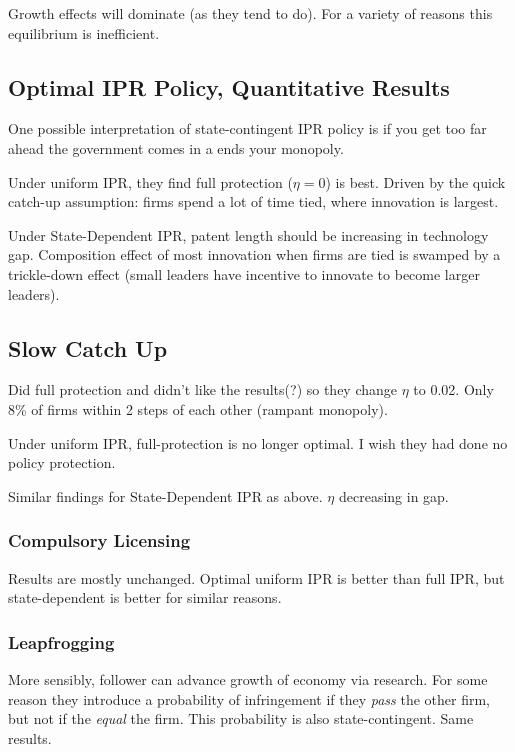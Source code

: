\documentclass[11pt]{article}
\begin{document}
    Growth effects will dominate (as they tend to do).  For a variety of reasons this equilibrium is inefficient.

\subsection{Optimal IPR Policy, Quantitative Results}
\label{sub:optimal_ipr_policy_quantitative_results}

  One possible interpretation of state-contingent IPR policy is if you get too far ahead the government comes in a ends your monopoly.

  Under uniform IPR, they find full protection ($\eta = 0$) is best.  Driven by the quick catch-up assumption: firms spend a lot of time tied, where innovation is largest.

  Under State-Dependent IPR, patent length should be increasing in technology gap.  Composition effect of most innovation when firms are tied is swamped by a trickle-down effect (small leaders have incentive to innovate to become larger leaders).

\subsection{Slow Catch Up}
\label{sub:slow_catch_up}

  Did full protection and didn't like the results(?) so they change $\eta$ to 0.02. Only 8\% of firms within 2 steps of each other (rampant monopoly).

  Under uniform IPR, full-protection is no longer optimal.  I wish they had done no policy protection. 

  Similar findings for State-Dependent IPR as above.  $\eta$ decreasing in gap.

  \subsubsection{Compulsory Licensing}
  \label{subsub:compulsory_licensing}

    Results are mostly unchanged.  Optimal uniform IPR is better than full IPR, but state-dependent is better for similar reasons.

  \subsubsection{Leapfrogging}
  \label{subsub:leapfrogging}

    More sensibly, follower can advance growth of economy via research.  For some reason they introduce a probability of infringement if they \emph{pass} the other firm, but not if the \emph{equal} the firm.  This probability is also state-contingent.  Same results.
\end{document}
